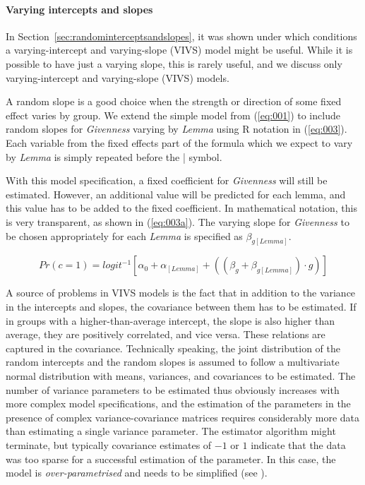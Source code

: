 \paragraph{Varying intercepts and slopes}

In Section~\ref{sec:randominterceptsandslopes}, it was shown under which conditions a varying-intercept and varying-slope (VIVS) model might be useful.
While it is possible to have just a varying slope, this is rarely useful, and we discuss only varying-intercept and varying-slope (VIVS) models.

A random slope is a good choice when the strength or direction of some fixed effect varies by group.
We extend the simple model from (\ref{eq:001}) to include random slopes for \textit{Givenness} varying by \textit{Lemma} using R notation in (\ref{eq:003}).
Each variable from the fixed effects part of the formula which we expect to vary by \textit{Lemma} is simply repeated before the | symbol.


With this model specification, a fixed coefficient for \textit{Givenness} will still be estimated.
However, an additional value will be predicted for each lemma, and this value has to be added to the fixed coefficient.
In mathematical notation, this is very transparent, as shown in (\ref{eq:003a}).
The varying slope for \textit{Givenness} to be chosen appropriately for each \textit{Lemma} is specified as $\beta_{g[Lemma]}$.

\begin{equation}
  Pr(c=1)=logit^{-1}\left[\alpha_0+\alpha_{[Lemma]}+((\beta_{g}+\beta_{g[Lemma]}) \cdot g)\right]
  \label{eq:003a}
\end{equation}

A source of problems in VIVS models is the fact that in addition to the variance in the intercepts and slopes, the covariance between them has to be estimated.
If in groups with a higher-than-average intercept, the slope is also higher than average, they are positively correlated, and vice versa.
These relations are captured in the covariance.
Technically speaking, the joint distribution of the random intercepts and the random slopes is assumed to follow a multivariate normal distribution with means, variances, and covariances to be estimated.
The number of variance parameters to be estimated thus obviously increases with more complex model specifications, and the estimation of the parameters in the presence of complex variance-covariance matrices requires considerably more data than estimating a single variance parameter.
The estimator algorithm might terminate, but typically covariance estimates of $-1$ or $1$ indicate that the data was too sparse for a successful estimation of the parameter.
In this case, the model is \textit{over-parametrised} and needs to be simplified (see \citealt{BatesEa2015a,MatuschekEa2017}).


